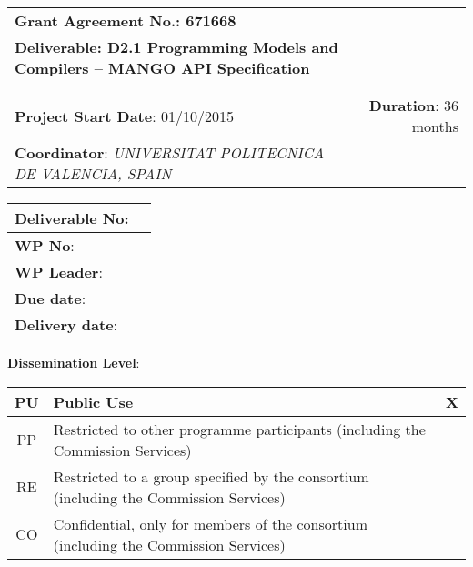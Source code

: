 

\begin{tabularx}{\textwidth}{Xr}
\textbf{Grant Agreement No.: 671668}&\\
\textbf{Deliverable: D2.1 Programming Models and Compilers -- MANGO API Specification}&\\
&\\
&\\
\textbf{Project Start Date}:  01/10/2015 &	\textbf{Duration}: 36 months\\
\textbf{Coordinator}: \emph{UNIVERSITAT POLITECNICA DE VALENCIA, SPAIN} & \\
\end{tabularx}


\begin{tabularx}{\textwidth}{|l|X|}
\toprule
\textbf{Deliverable No}: &	 	\\
\midrule
\textbf{WP No}:& 							\\
\midrule
\textbf{WP Leader}:& 					\\
\midrule
\textbf{Due date}:&						\\
\midrule
\textbf{Delivery date}:& 			\\
\bottomrule
\end{tabularx}


\textbf{Dissemination Level}:

\begin{tabularx}{\textwidth}{|c|X|c|}
\toprule
PU & Public Use							& X \\
\midrule
PP & Restricted to other programme participants (including the Commission Services)	&\\
\midrule
RE & Restricted to a group specified by the consortium (including the Commission Services)	&\\
\midrule
CO & Confidential, only for members of the consortium (including the Commission Services) &\\
\bottomrule
\end{tabularx}
